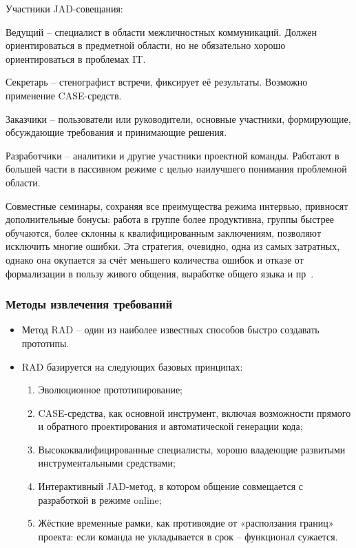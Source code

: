 \documentclass{../industrial-development}
\begin{document}
Участники JAD-совещания:

\alert{Ведущий} – специалист в области межличностных коммуникаций. Должен
ориентироваться в предметной области, но не обязательно хорошо ориентироваться в
проблемах IT.

\alert{Секретарь} – стенографист встречи, фиксирует её результаты. Возможно применение CASE-средств.

\alert{Заказчики} – пользователи или руководители, основные участники, формирующие,
обсуждающие требования и принимающие решения.

\alert{Разработчики} – аналитики и другие участники проектной команды. Работают в
большей части в пассивном режиме с целью наилучшего понимания проблемной области.

Совместные семинары, сохраняя все преимущества режима интервью, привносят дополнительные бонусы: работа в группе более продуктивна, группы быстрее обучаются, более склонны к квалифицированным заключениям, позволяют исключить многие ошибки. Эта стратегия, очевидно, одна из самых затратных, однако она окупается за счёт меньшего количества ошибок и отказе от формализации в пользу живого общения,
выработке общего языка и пр~\cite[с.~33]{Maglinec}.


\begin{frame} \frametitle{Методы извлечения требований}
   
\begin{itemize}
\item \alert{Метод RAD} – один из наиболее известных способов быстро создавать прототипы.
\item RAD базируется на следующих базовых принципах:
\begin{enumerate}
\item Эволюционное прототипирование;
\item CASE-средства, как основной инструмент, включая возможности прямого и
обратного проектирования и автоматической генерации кода;
\item  Высококвалифицированные специалисты, хорошо владеющие развитыми инструментальными средствами;
\item Интерактивный JAD-метод, в котором общение совмещается с разработкой в режиме online;
\item Жёсткие временные рамки, как противоядие от «расползания границ» проекта: если команда не укладывается в срок – функционал сужается.
\end{enumerate}
\end{itemize}

\end{frame}
\lecturenotes
\end{document}
